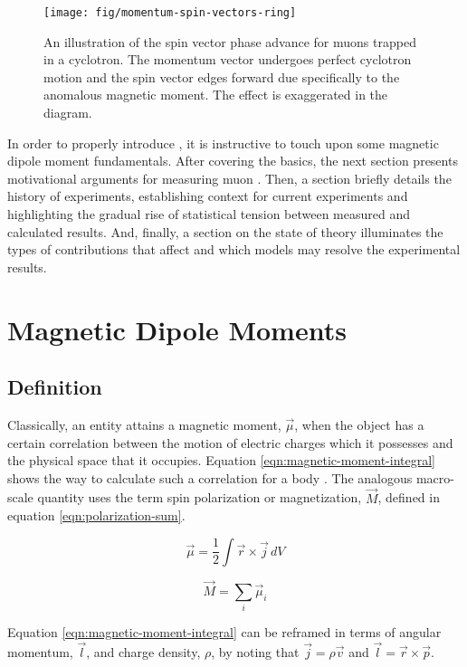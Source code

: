 \begin{figure}
\label{fig:spin-phase-advance}
\centering
\texttt{[image: fig/momentum-spin-vectors-ring]}
\caption{An illustration of the spin vector phase advance for muons trapped in a cyclotron.  The momentum vector undergoes perfect cyclotron motion and the spin vector edges forward due specifically to the anomalous magnetic moment.  The effect is exaggerated in the diagram.}
\end{figure}

In order to properly introduce \gmtwo, it is instructive to touch upon some magnetic dipole moment fundamentals.  After covering the basics, the next section presents motivational arguments for measuring muon \gmtwo. Then, a section briefly details the history of \mugmtwo experiments, establishing context for current \mugmtwo experiments and highlighting the gradual rise of statistical tension between measured and calculated results.  And, finally, a section on the state of theory illuminates the types of contributions that affect \mugmtwo and which models may resolve the experimental results.

\section{Magnetic Dipole Moments}

\subsection{Definition}
Classically, an entity attains a magnetic moment, $\vec{\mu}$, when the object has a certain correlation between the motion of electric charges which it possesses and the physical space that it occupies.  Equation \ref{eqn:magnetic-moment-integral} shows the way to calculate such a correlation for a body \cite{jackson}.  The analogous macro-scale quantity uses the term spin polarization or magnetization, $\vec{M}$, defined in equation \ref{eqn:polarization-sum}.

\begin{equation}
\label{eqn:magnetic-moment-integral}
\vec{\mu} = \frac{1}{2} \int \vec{r} \times \vec{j} \,dV
\end{equation}

\begin{equation}
\label{eqn:polarization-sum}
\vec{M} = \sum_i \vec{\mu}_i
\end{equation}

\noindent
Equation \ref{eqn:magnetic-moment-integral} can be reframed in terms of angular momentum, $\vec{l}$, and charge density, $
\rho$, by noting that $\vec{j} = \rho \vec{v}$ and $\vec{l} = \vec{r} \times \vec{p}$.

